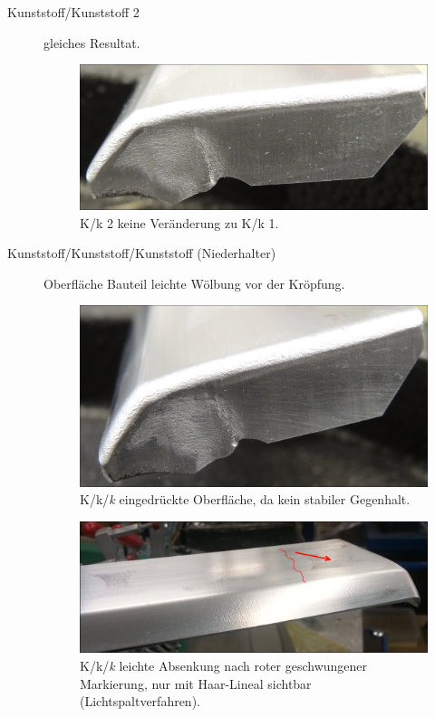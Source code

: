 \documentclass[12pt,a4paper,parskip,twoside,BCOR5mm,headsepline]{scrartcl}
\begin{document}
\begin{description*}
\begin{description}
\item[Kunststoff/Kunststoff 2] gleiches Resultat.
\begin{figure}[H]
\centering
\includegraphics[width=.8\textwidth]{Kk2}
\caption{K/k 2 keine Veränderung zu K/k 1.}
\label{fig:Kb1a}
\end{figure}
\newpage

\item[Kunststoff/Kunststoff/Kunststoff (Niederhalter)] Oberfläche Bauteil leichte Wölbung vor der Kröpfung.
\begin{figure}[H]
\centering
\includegraphics[width=.8\textwidth]{Kkk1}
\caption{K/k/\emph{k} eingedrückte Oberfläche, da kein stabiler Gegenhalt.}
\label{fig:Kkk1}
\end{figure}
\begin{figure}[H]
\centering
\includegraphics[width=.8\textwidth]{BauteilAbsenkSk3}
\caption{K/k/\emph{k} leichte Absenkung nach roter geschwungener Markierung, nur mit Haar-Lineal sichtbar (Lichtspaltverfahren).}
\label{fig:sKs3}
\end{figure}
\newpage


\end{description}
\end{description*}
\end{document}
